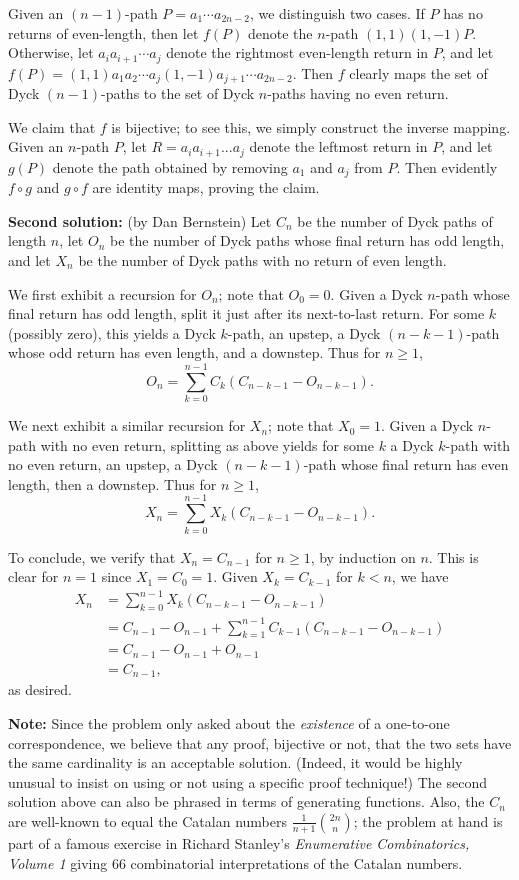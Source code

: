 \documentclass[amssymb,twocolumn,pra,10pt,aps]{revtex4-1}
\begin{document}
\begin{itemize}
Given an $(n-1)$-path $P=a_1\cdots a_{2n-2}$, we distinguish two cases.
If $P$ has no returns of even-length, then let $f(P)$ denote the $n$-path
$(1,1)(1,-1)P$.  Otherwise, let $a_ia_{i+1}\cdots a_{j}$ denote the
rightmost even-length return in $P$, and let $f(P)=(1,1)a_1a_2\cdots
a_j(1,-1)a_{j+1}\cdots a_{2n-2}$.  Then $f$ clearly maps the set of Dyck
$(n-1)$-paths to the set of Dyck $n$-paths having no even return.

We claim that $f$ is bijective; to see this, we simply construct the
inverse mapping.  Given an $n$-path $P$, let $R=a_ia_{i+1}...a_j$
denote the leftmost return in $P$, and let $g(P)$ denote the
path obtained by removing $a_1$ and $a_j$ from $P$.  Then evidently
$f \circ g$ and $g \circ f$ are identity maps, proving the claim.

\textbf{Second solution:} (by Dan Bernstein)
Let $C_n$ be the number of Dyck paths of length $n$, let $O_n$ be the number
of Dyck paths whose final return has odd length, and let $X_n$ be the number
of Dyck paths with no return of even length.

We first exhibit a recursion for $O_n$; note that $O_0 = 0$.
Given a Dyck $n$-path
whose final return has odd length, split it just after its next-to-last return.
For some $k$ (possibly zero), this yields
a Dyck $k$-path, an upstep, a Dyck $(n-k-1)$-path whose odd return
has even length, and a downstep. Thus for $n \geq 1$,
\[
O_n = \sum_{k=0}^{n-1} C_k (C_{n-k-1} - O_{n-k-1}).
\]

We next exhibit a similar recursion for $X_n$; note that $X_0 = 1$.
Given a Dyck $n$-path with no even return,
splitting as above yields for some $k$
a Dyck $k$-path with no even return,
an upstep, a Dyck $(n-k-1)$-path whose final return has even length,
then a downstep. Thus for $n \geq 1$,
\[
X_n = \sum_{k=0}^{n-1} X_k (C_{n-k-1} - O_{n-k-1}).
\]

To conclude, we verify that $X_n = C_{n-1}$ for $n \geq 1$,
by induction on $n$. This is
clear for $n=1$ since $X_1 = C_0 = 1$. Given $X_k = C_{k-1}$ for $k<n$, we have
\begin{align*}
X_n  &=
\sum_{k=0}^{n-1} X_k (C_{n-k-1} - O_{n-k-1}) \\
&= C_{n-1} - O_{n-1} + \sum_{k=1}^{n-1} C_{k-1} (C_{n-k-1} - O_{n-k-1}) \\
&= C_{n-1} - O_{n-1} + O_{n-1} \\
&= C_{n-1},
\end{align*}
as desired.

\textbf{Note:}
Since the problem only asked about the \emph{existence} of a
one-to-one correspondence, we believe that any proof, bijective or not,
that the two sets
have the same cardinality is an acceptable solution. (Indeed, it would be
highly unusual to insist on using or not using a specific proof technique!)
The second solution
above can also be phrased in terms of generating functions.
Also, the $C_n$ are well-known to equal the Catalan numbers
$\frac{1}{n+1} \binom{2n}{n}$; the problem at hand is part of a famous
exercise in Richard Stanley's \textit{Enumerative Combinatorics, Volume 1}
giving 66 combinatorial interpretations of the Catalan numbers.


\end{itemize}
\end{document}
